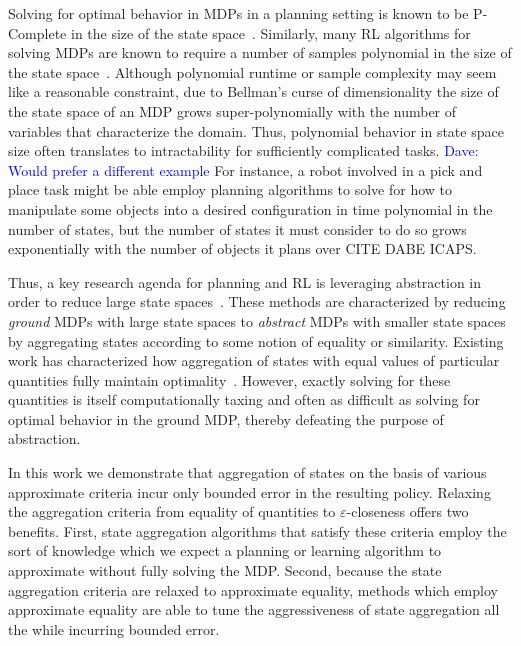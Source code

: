\documentclass{article}
\newcommand\dnote[1]{\textcolor{blue}{Dave: #1}}
\begin{document}
Solving for optimal behavior in \acp{MDP} in a planning setting is known to be P-Complete in the size of the state space~\cite{littman1995complexity,papadimitriou1987complexity}. Similarly, many \ac{RL} algorithms for solving \acp{MDP} are known to require a number of samples polynomial in the size of the state space~\cite{strehl2009reinforcement}. Although polynomial runtime or sample complexity may seem like a reasonable constraint, due to Bellman's curse of dimensionality the size of the state space of an \ac{MDP} grows super-polynomially with the number of variables that characterize the domain. Thus, polynomial behavior in state space size often translates to intractability for sufficiently complicated tasks. \dnote{Would prefer a different example} For instance, a robot involved in a pick and place task might be able employ planning algorithms to solve for how to manipulate some objects into a desired configuration in time polynomial in the number of states, but the number of states it must consider to do so grows exponentially with the number of objects it plans over CITE DABE ICAPS.

Thus, a key research agenda for planning and RL is leveraging abstraction in order to reduce large state spaces~\cite{andre2002state,jong2005state,dietterich2000hierarchical,Bean2011}. These methods are characterized by reducing \textit{ground} MDPs with large state spaces to \textit{abstract} MDPs with smaller state spaces by aggregating states according to some notion of equality or similarity. Existing work has characterized how aggregation of states with equal values of particular quantities fully maintain optimality~\cite{li2006towards,dean1997modelmin}. However, exactly solving for these quantities is itself computationally taxing and often as difficult as solving for optimal behavior in the ground \ac{MDP}, thereby defeating the purpose of abstraction.

In this work we demonstrate that aggregation of states on the basis of various approximate criteria incur only bounded error in the resulting policy. Relaxing the aggregation criteria from equality of quantities to $\varepsilon$-closeness offers two benefits. First, state aggregation algorithms that satisfy these criteria employ the sort of knowledge which we expect a planning or learning algorithm to approximate without fully solving the \ac{MDP}. Second, because the state aggregation criteria are relaxed to approximate equality, methods which employ approximate equality are able to tune the aggressiveness of state aggregation all the while incurring bounded error.
\end{document}
